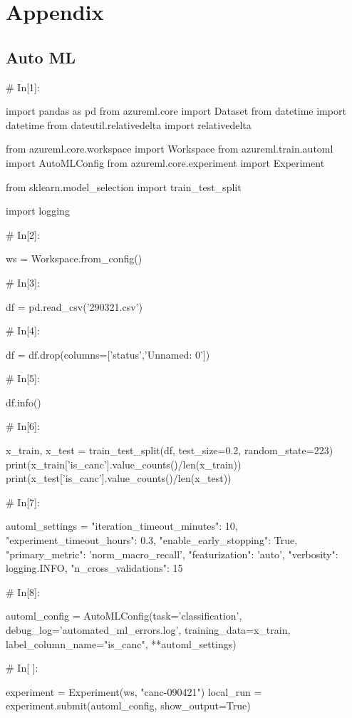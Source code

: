 \chapter{Appendix}

\section{Auto ML}

\begin{python}
# In[1]:


import pandas as pd
from azureml.core import Dataset
from datetime import datetime
from dateutil.relativedelta import relativedelta

from azureml.core.workspace import Workspace
from azureml.train.automl import AutoMLConfig
from azureml.core.experiment import Experiment

from sklearn.model_selection import train_test_split

import logging


# In[2]:


ws = Workspace.from_config()


# In[3]:


df = pd.read_csv('290321.csv')


# In[4]:


df = df.drop(columns=['status','Unnamed: 0'])


# In[5]:


df.info()


# In[6]:


x_train, x_test = train_test_split(df, test_size=0.2, random_state=223)
print(x_train['is_canc'].value_counts()/len(x_train))
print(x_test['is_canc'].value_counts()/len(x_test))


# In[7]:


automl_settings = {
    "iteration_timeout_minutes": 10,
    "experiment_timeout_hours": 0.3,
    "enable_early_stopping": True,
    "primary_metric": 'norm_macro_recall',
    "featurization": 'auto',
    "verbosity": logging.INFO,
    "n_cross_validations": 15
}


# In[8]:


automl_config = AutoMLConfig(task='classification',
                             debug_log='automated_ml_errors.log',
                             training_data=x_train,
                             label_column_name="is_canc",
                             **automl_settings)


# In[ ]:


experiment = Experiment(ws, "canc-090421")
local_run = experiment.submit(automl_config, show_output=True)



\end{python}
